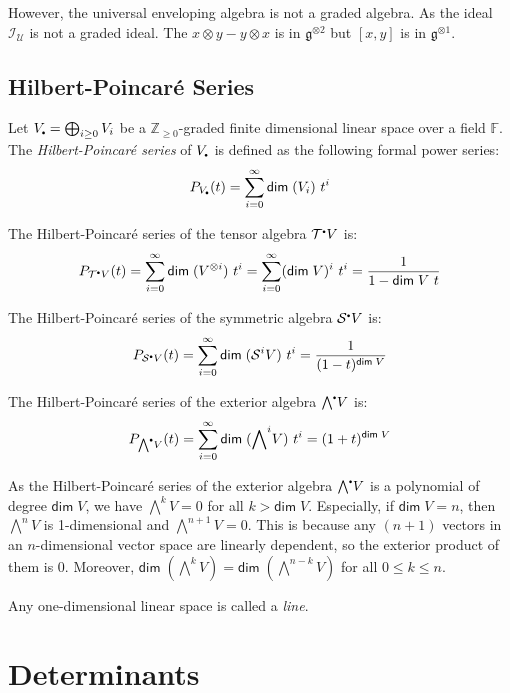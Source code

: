 \documentclass[
	11pt, %
	fleqn, %
	a4paper, %
]{LegrandOrangeBook}
\newcommand{\smallbullet}{\scalebox{0.5}{$\bullet$}}
\newcommand{\F}{\mathbb{F}} %
\newcommand{\T}{\mathcal{T}^{\smallbullet}} %
\newcommand{\Sym}{\mathcal{S}^{\smallbullet}} %
\newcommand{\Ext}{{\bigwedge}^{\smallbullet}} %
\newcommand{\Env}{\mathcal{U}} %
\newcommand{\ideal}{\mathcal{I}} %
\newcommand{\Z}{\mathbb{Z}} %
\renewcommand{\dim}{\mathsf{dim\;}} %
\begin{document}
\begin{remark}
    However, the universal enveloping algebra is not a graded algebra. As the ideal $\ideal_{\Env}$ is not a graded ideal. The $x \otimes y - y \otimes x$ is in $\mathfrak{g}^{\otimes 2}$ but $[x, y]$ is in $\mathfrak{g}^{\otimes 1}$.
\end{remark}

\newpage

\section{Hilbert-Poincaré Series}
Let $V_{\smallbullet} = \bigoplus_{i \geq 0} V_i$ be a $\Z_{\geq 0}$-graded finite dimensional linear space over a field $\F$. The \emph{Hilbert-Poincaré series} of $V_{\smallbullet}$ is defined as the following formal power series:
\[
    P_{V_{\smallbullet}}(t) = \sum_{i = 0}^{\infty} \dim(V_i)\ t^i
\]

\begin{example}
    The Hilbert-Poincaré series of the tensor algebra $\T V$ is:
    \[
        P_{\T V}(t) = \sum_{i = 0}^{\infty} \dim(V^{\otimes i})\ t^i = \sum_{i = 0}^{\infty} (\dim{V})^i\ t^i = \frac{1}{1 - \dim{V}\ t}
    \]
\end{example}

\begin{example}
    The Hilbert-Poincaré series of the symmetric algebra $\Sym V$ is:
    \[
        P_{\Sym V}(t) = \sum_{i = 0}^{\infty} \dim(\mathcal{S}^i V)\ t^i = \frac{1}{(1 - t)^{\dim{V}}}
    \]
\end{example}

\begin{example}
    The Hilbert-Poincaré series of the exterior algebra $\Ext V$ is:
    \[
        P_{\Ext V}(t) = \sum_{i = 0}^{\infty} \dim({\bigwedge}^i V)\ t^i = (1 + t)^{\dim{V}}
    \]
\end{example}

As the Hilbert-Poincaré series of the exterior algebra $\Ext V$ is a polynomial of degree $\dim{V}$, we have ${\bigwedge}^k V = 0$ for all $k > \dim{V}$. Especially, if $\dim{V} = n$, then ${\bigwedge}^n V$ is 1-dimensional and ${\bigwedge}^{n + 1} V = 0$. This is because any $(n + 1)$ vectors in an $n$-dimensional vector space are linearly dependent, so the exterior product of them is $0$. Moreover, $\dim({\bigwedge}^k V) = \dim({\bigwedge}^{n - k} V)$ for all $0 \leq k \leq n$.

Any one-dimensional linear space is called a \emph{line}.
\chapter{Determinants}
\end{document}
